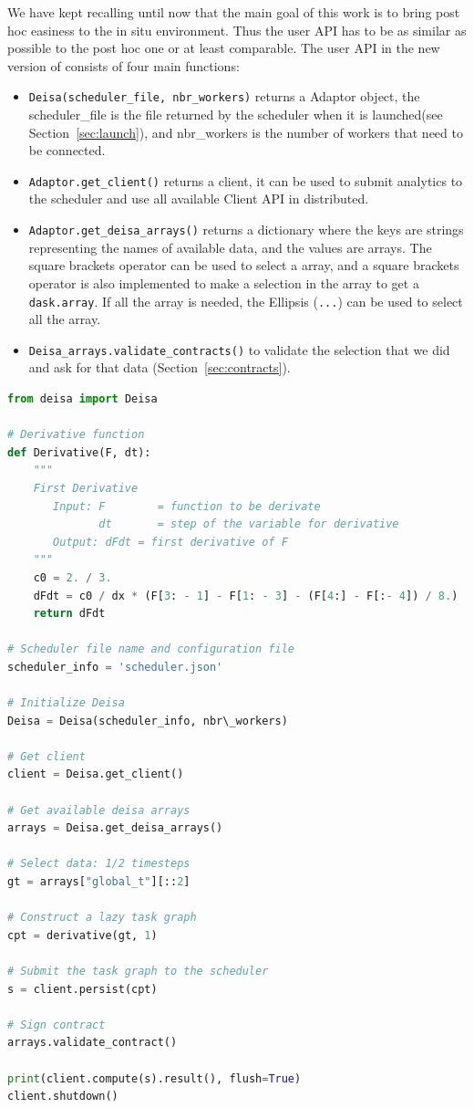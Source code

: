 We have kept recalling until now that the main goal of this work is to bring post hoc easiness to the in situ environment. Thus the user API has to be as similar as possible to the post hoc one or at least comparable. The user API in the new version of \deisa consists of four main functions: 
\begin{itemize}
    \item \texttt{Deisa(scheduler\_file, nbr\_workers)} returns a \deisa Adaptor object, the scheduler\_file is the file returned by the scheduler when it is launched(see Section~\ref{sec:launch}), and nbr\_workers is the number of workers that need to be connected.  

    \item \texttt{Adaptor.get\_client()} returns a \dask client, it can be used to submit analytics to the scheduler and use all available Client API in \dask distributed.
    
    \item \texttt{Adaptor.get\_deisa\_arrays()} returns a dictionary where the keys are strings representing the names of available data, and the values are \deisa arrays. The square brackets operator can be used to select a \deisa array, and a square brackets operator is also implemented to make a selection in the \deisa array to get a \texttt{dask.array}. If all the array is needed, the Ellipsis (\texttt{...}) can be used to select all the array.
    
    \item \texttt{Deisa\_arrays.validate\_contracts()} to validate the selection that we did and ask for that data (Section~\ref{sec:contracts}).
\end{itemize}


\begin{lstlisting}[float=h!, label=listderiv, language=python, caption=In situ incremental temporal derivative]
from deisa import Deisa

# Derivative function
def Derivative(F, dt):
    """
    First Derivative
       Input: F        = function to be derivate
              dt       = step of the variable for derivative
       Output: dFdt = first derivative of F
    """
    c0 = 2. / 3.
    dFdt = c0 / dx * (F[3: - 1] - F[1: - 3] - (F[4:] - F[:- 4]) / 8.)
    return dFdt

# Scheduler file name and configuration file
scheduler_info = 'scheduler.json'

# Initialize Deisa
Deisa = Deisa(scheduler_info, nbr\_workers)

# Get client
client = Deisa.get_client()

# Get available deisa arrays 
arrays = Deisa.get_deisa_arrays()

# Select data: 1/2 timesteps
gt = arrays["global_t"][::2]

# Construct a lazy task graph
cpt = derivative(gt, 1)

# Submit the task graph to the scheduler
s = client.persist(cpt)

# Sign contract
arrays.validate_contract()

print(client.compute(s).result(), flush=True)
client.shutdown()
\end{lstlisting}


